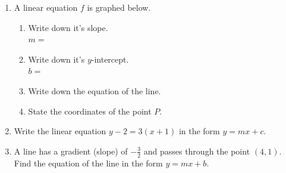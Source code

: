 \begin{enumerate}
\item A linear equation $f$ is graphed below.
\begin{multicols}{2}
\begin{enumerate}
  \item Write down it's slope.\\ $m=$
  \vspace{0.25cm}
  \item Write down it's $y$-intercept.\\ $b=$
  \vspace{0.25cm}
  \item Write down the equation of the line.
  \vspace{1cm}
  \item State the coordinates of the point $P$.
\end{enumerate} \vspace{.5cm}
  \begin{center} 
  \end{center}
\end{multicols}

\item Write the linear equation $y-2=3(x+1)$ in the form $y=mx+c$. \vspace{4cm}

\item A line has a gradient (slope) of $\displaystyle -\frac{3}{2}$ and passes through the point $(4, 1)$. Find the equation of the line in the form $y=mx+b$.


\end{enumerate}
